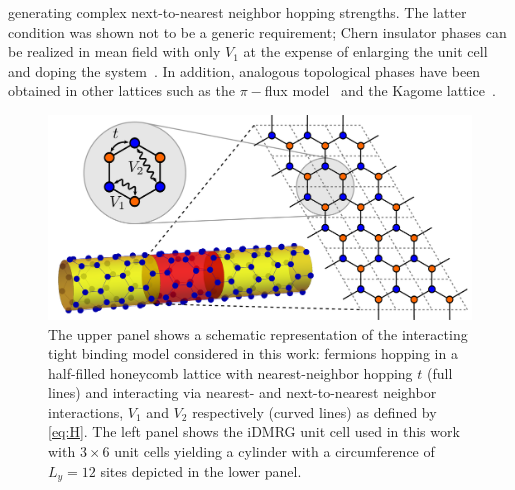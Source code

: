 \documentclass[aps,prx,10pt,twocolumn,floatfix,superscriptaddress,showpacs,numerical,footinbib]{revtex4-1}
\begin{document}
generating complex next-to-nearest neighbor hopping strengths.
%
The latter condition was shown not to be a generic requirement; Chern insulator phases can be realized 
in mean field with only $V_{1}$ at the expense of enlarging the unit cell and doping the system~\cite{CGV11,GCC13}.
%
In addition, analogous topological phases have been obtained in other lattices such as the $\pi-$flux model~\cite{WF10,JGC13} and the Kagome lattice~\cite{WRW10}.
%
\begin{figure}
%
 \includegraphics[width=\columnwidth]{pdf/unit_cell.pdf}
 \caption{The upper panel shows a schematic representation of the interacting tight binding model considered in this work:
fermions hopping in a half-filled honeycomb lattice with nearest-neighbor hopping $t$ (full lines) and interacting via
 nearest- and next-to-nearest neighbor interactions, $V_{1}$ and $V_{2}$ respectively (curved lines) as defined by 
 \eqref{eq:H}.
 The left panel shows the iDMRG unit cell used in this work with 
 $3 \times 6$ unit cells yielding a cylinder with a circumference of $L_{y}=12$ sites depicted in the lower panel. 
 \label{fig:Defs}}
\end{figure}
\\
\end{document}
